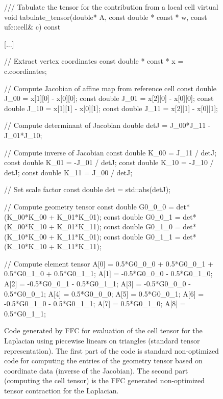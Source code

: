 \begin{figure}
\bwfig
  \scriptsize
  \begin{c++}
/// Tabulate the tensor for the contribution from a local cell
virtual void tabulate_tensor(double* A,
                             const double * const * w,
                             const ufc::cell& c) const
{
  [...]

  // Extract vertex coordinates
  const double * const * x = c.coordinates;

  // Compute Jacobian of affine map from reference cell
  const double J_00 = x[1][0] - x[0][0];
  const double J_01 = x[2][0] - x[0][0];
  const double J_10 = x[1][1] - x[0][1];
  const double J_11 = x[2][1] - x[0][1];

  // Compute determinant of Jacobian
  double detJ = J_00*J_11 - J_01*J_10;

  // Compute inverse of Jacobian
  const double K_00 =  J_11 / detJ;
  const double K_01 = -J_01 / detJ;
  const double K_10 = -J_10 / detJ;
  const double K_11 =  J_00 / detJ;

  // Set scale factor
  const double det = std::abs(detJ);

  // Compute geometry tensor
  const double G0_0_0 = det*(K_00*K_00 + K_01*K_01);
  const double G0_0_1 = det*(K_00*K_10 + K_01*K_11);
  const double G0_1_0 = det*(K_10*K_00 + K_11*K_01);
  const double G0_1_1 = det*(K_10*K_10 + K_11*K_11);

  // Compute element tensor
  A[0] = 0.5*G0_0_0 + 0.5*G0_0_1 + 0.5*G0_1_0 + 0.5*G0_1_1;
  A[1] = -0.5*G0_0_0 - 0.5*G0_1_0;
  A[2] = -0.5*G0_0_1 - 0.5*G0_1_1;
  A[3] = -0.5*G0_0_0 - 0.5*G0_0_1;
  A[4] = 0.5*G0_0_0;
  A[5] = 0.5*G0_0_1;
  A[6] = -0.5*G0_1_0 - 0.5*G0_1_1;
  A[7] = 0.5*G0_1_0;
  A[8] = 0.5*G0_1_1;
}
  \end{c++}
  \caption{Code generated by FFC for evaluation of the cell tensor
    for the Laplacian using piecewise linears on triangles (standard
    tensor representation). The first part of the code is standard
    non-optimized code for computing the entries of the geometry
    tensor based on coordinate data (inverse of the Jacobian). The
    second part (computing the cell tensor) is the FFC generated
    non-optimized tensor contraction for the Laplacian.}
  \label{fig:code,poisson}
\end{figure}

